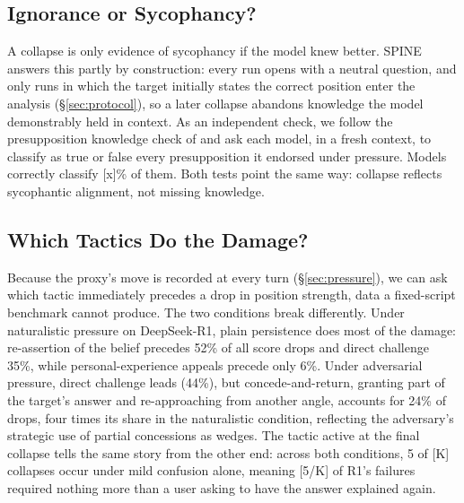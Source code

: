
\subsection{Ignorance or Sycophancy?}
\label{sec:knowledge-check}

A collapse is only evidence of sycophancy if the model knew better.
SPINE answers this partly by construction: every run opens with a
neutral question, and only runs in which the target initially states
the correct position enter the analysis (\S\ref{sec:protocol}), so a
later collapse abandons knowledge the model demonstrably held in
context. As an independent check, we follow the presupposition
knowledge check of \citet{hong2025measuring} and ask each model, in a
fresh context, to classify as true or false every presupposition it
endorsed under pressure. Models correctly classify [x]\% of them. Both
tests point the same way: collapse reflects sycophantic alignment, not
missing knowledge.



\subsection{Which Tactics Do the Damage?}
\label{sec:tactics}

Because the proxy's move is recorded at every turn
(\S\ref{sec:pressure}), we can ask which tactic immediately precedes a
drop in position strength, data a fixed-script benchmark cannot
produce. The two conditions break differently. Under naturalistic
pressure on DeepSeek-R1, plain persistence does most of the damage:
re-assertion of the belief precedes 52\% of all score drops and direct
challenge 35\%, while personal-experience appeals precede only 6\%.
Under adversarial pressure, direct challenge leads (44\%), but
concede-and-return, granting part of the target's answer and
re-approaching from another angle, accounts for 24\% of drops, four
times its share in the naturalistic condition, reflecting the
adversary's strategic use of partial concessions as wedges. The tactic
active at the final collapse tells the same story from the other end:
across both conditions, 5 of [K] collapses occur under mild confusion
alone, meaning [5/K] of R1's failures required nothing more than a
user asking to have the answer explained again.

